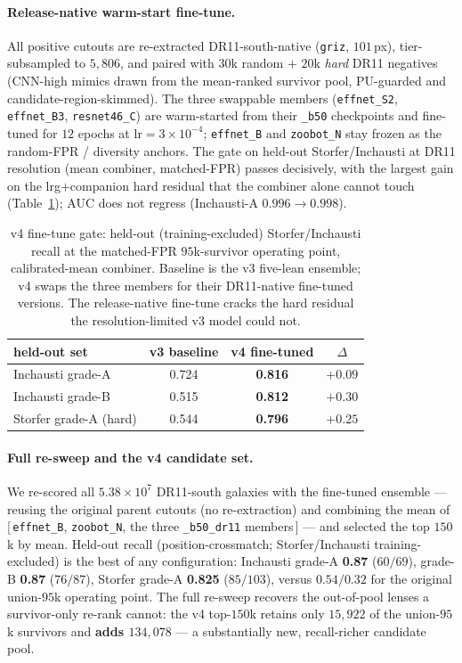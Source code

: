 \paragraph{Release-native warm-start fine-tune.} All positive cutouts are re-extracted DR11-south-native
(\texttt{griz}, $101$\,px), tier-subsampled to $5{,}806$, and paired with $30$k random $+$ $20$k
\emph{hard} DR11 negatives (CNN-high mimics drawn from the mean-ranked survivor pool, PU-guarded and
candidate-region-skimmed). The three swappable members (\texttt{effnet\_S2}, \texttt{effnet\_B3},
\texttt{resnet46\_C}) are warm-started from their \texttt{\_b50} checkpoints and fine-tuned for $12$
epochs at $\mathrm{lr}{=}3\times10^{-4}$; \texttt{effnet\_B} and \texttt{zoobot\_N} stay frozen as the
random-FPR / diversity anchors. The gate on held-out Storfer/Inchausti at DR11 resolution
(mean combiner, matched-FPR) passes decisively, with the largest gain on the lrg$+$companion hard
residual that the combiner alone cannot touch (Table~\ref{tab:v4gate}); AUC does not regress
(Inchausti-A $0.996\!\to\!0.998$).

\begin{table}[t]\centering
\caption{v4 fine-tune gate: held-out (training-excluded) Storfer/Inchausti recall at the matched-FPR
$95$k-survivor operating point, calibrated-mean combiner. Baseline is the v3 five-lean ensemble; v4
swaps the three members for their DR11-native fine-tuned versions. The release-native fine-tune cracks
the hard residual the resolution-limited v3 model could not.}
\label{tab:v4gate}
\begin{tabular}{lccc}
\toprule
held-out set & v3 baseline & v4 fine-tuned & $\Delta$ \\
\midrule
Inchausti grade-A & 0.724 & \textbf{0.816} & $+0.09$ \\
Inchausti grade-B & 0.515 & \textbf{0.812} & $+0.30$ \\
Storfer grade-A (hard) & 0.544 & \textbf{0.796} & $+0.25$ \\
\bottomrule
\end{tabular}
\end{table}

\paragraph{Full re-sweep and the v4 candidate set.} We re-scored all $5.38\times10^{7}$ DR11-south
galaxies with the fine-tuned ensemble --- reusing the original parent cutouts (no re-extraction) and
combining the mean of [\,\texttt{effnet\_B}, \texttt{zoobot\_N}, the three \texttt{\_b50\_dr11} members\,]
--- and selected the top $150$k by mean. Held-out recall (position-crossmatch; Storfer/Inchausti
training-excluded) is the best of any configuration: Inchausti grade-A \textbf{0.87} ($60/69$),
grade-B \textbf{0.87} ($76/87$), Storfer grade-A \textbf{0.825} ($85/103$), versus $0.54/0.32$ for the
original union-$95$k operating point. The full re-sweep recovers the out-of-pool lenses a survivor-only
re-rank cannot: the v4 top-$150$k retains only $15{,}922$ of the union-$95$k survivors and \textbf{adds
$134{,}078$} --- a substantially new, recall-richer candidate pool.

